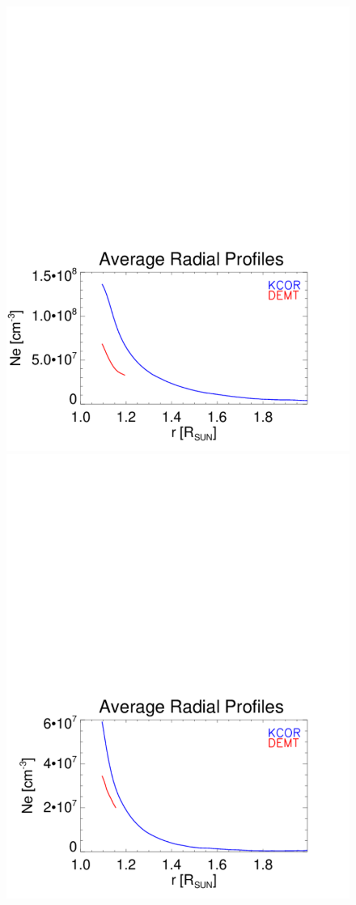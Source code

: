 \documentclass[baaa]{baaa}
\begin{document}
\begin{figure}[!h]
  \includegraphics[width=0.75\columnwidth]{Average_Radial_Profiles_KCOR-Tom_vs_DEMT_CR2198_Hh_l09_kcor_1e-5_bloqueados-Quiet-region1.pdf}
  \hskip 2cm
  \includegraphics[width=0.75\columnwidth]{Average_Radial_Profiles_KCOR-Tom_vs_DEMT_CR2198_Hh_l09_kcor_1e-5_bloqueados-Open-region_N.pdf}

\end{figure}
\end{document}
